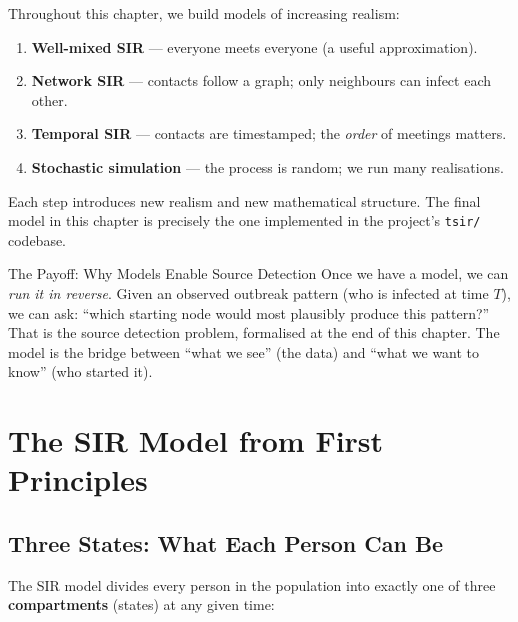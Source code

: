 Throughout this chapter, we build models of increasing realism:

\begin{enumerate}[noitemsep]
    \item \textbf{Well-mixed SIR} --- everyone meets everyone (a useful approximation).
    \item \textbf{Network SIR} --- contacts follow a graph; only neighbours can infect each other.
    \item \textbf{Temporal SIR} --- contacts are timestamped; the \emph{order} of meetings matters.
    \item \textbf{Stochastic simulation} --- the process is random; we run many realisations.
\end{enumerate}

Each step introduces new realism and new mathematical structure. The final model in this chapter is precisely the one implemented in the project's \texttt{tsir/} codebase.

\begin{keyinsight}{The Payoff: Why Models Enable Source Detection}
Once we have a model, we can \emph{run it in reverse}. Given an observed outbreak pattern (who is infected at time $T$), we can ask: ``which starting node would most plausibly produce this pattern?'' That is the source detection problem, formalised at the end of this chapter. The model is the bridge between ``what we see'' (the data) and ``what we want to know'' (who started it).
\end{keyinsight}

\section{The SIR Model from First Principles}
\label{sec:sir_model}

\subsection{Three States: What Each Person Can Be}

The SIR model divides every person in the population into exactly one of three \textbf{compartments} (states) at any given time:


